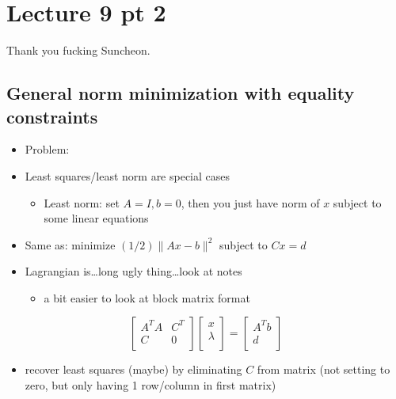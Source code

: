 \documentclass[10pt,letterpaper]{article}
\begin{document}
\section{Lecture 9 pt 2}
\label{sec-7}

Thank you fucking Suncheon.
\subsection{General norm minimization with equality constraints}
\label{sec-7_1}

\begin{itemize}
\item Problem: 
\item Least squares/least norm are special cases

\begin{itemize}
\item Least norm: set $A=I, b=0$, then you just have norm of $x$ subject to some linear equations
\end{itemize}

\item Same as: minimize $(1/2) \|Ax-b\| ^{2}$ subject to $Cx=d$
\item Lagrangian is\ldots{}long ugly thing\ldots{}look at notes

\begin{itemize}
\item a bit easier to look at block matrix format
\end{itemize}

\end{itemize}
$$
\begin{bmatrix}
  A ^{T} A & C ^{T} \\
  C        & 0      \\
\end{bmatrix}
\begin{bmatrix}
  x       \\
  \lambda \\
\end{bmatrix}
=
\begin{bmatrix}
  A ^{T} b \\
  d        \\
\end{bmatrix}
$$
\begin{itemize}
\item recover least squares (maybe) by eliminating $C$ from matrix (not setting to zero, but only having 1 row/column in first matrix)
\end{itemize}
\end{document}

